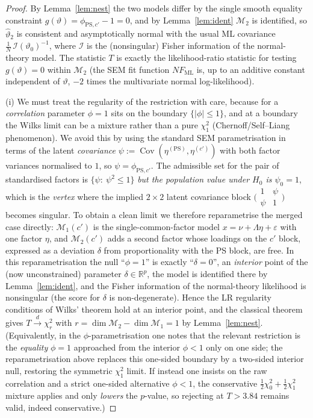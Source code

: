 \documentclass{amsart}
\theoremstyle{remark}
\begin{document}
\begin{proof}
By Lemma~\ref{lem:nest} the two models differ by the single smooth equality
constraint $g(\vartheta)=\phi_{\mathrm{PS},c'}-1=0$, and by Lemma~\ref{lem:ident}
$\mathcal M_2$ is identified, so $\hat\vartheta_2$ is consistent and asymptotically
normal with the usual ML covariance $\frac1N\,\mathcal I(\vartheta_0)^{-1}$, where
$\mathcal I$ is the (nonsingular) Fisher information of the normal-theory model.
The statistic $T$ is exactly the likelihood-ratio statistic for testing
$g(\vartheta)=0$ within $\mathcal M_2$ (the SEM fit function $NF_{\mathrm{ML}}$ is,
up to an additive constant independent of $\vartheta$, $-2$ times the multivariate
normal log-likelihood). 

(i) We must treat the regularity of the restriction with care, because for a
\emph{correlation} parameter $\phi=1$ sits on the boundary $\{|\phi|\le1\}$, and at
a boundary the Wilks limit can be a mixture rather than a pure $\chi^2_1$
(Chernoff/Self--Liang phenomenon). We avoid this by using the standard SEM
parametrisation in terms of the latent \emph{covariance} $\psi:=\operatorname{Cov}(\eta^{(\mathrm{PS})},\eta^{(c')})$
with both factor variances normalised to $1$, so $\psi=\phi_{\mathrm{PS},c'}$.
The admissible set for the pair of standardised factors is
$\{\psi:\ \psi^2\le1\}$ \emph{but the population value under $H_0$ is
$\psi_0=1$}, which is the \emph{vertex} where the implied $2\times2$ latent
covariance block $\bigl(\begin{smallmatrix}1&\psi\\ \psi&1\end{smallmatrix}\bigr)$
becomes singular. To obtain a clean limit we therefore reparametrise the merged
case directly: $\mathcal M_1(c')$ is the single-common-factor model
$x=\nu+\Lambda\eta+\varepsilon$ with one factor $\eta$, and $\mathcal M_2(c')$
adds a second factor whose loadings on the $c'$ block, expressed as a deviation
$\delta$ from proportionality with the PS block, are free. In this
reparametrisation the null ``$\phi=1$'' is exactly ``$\delta=0$'', an
\emph{interior} point of the (now unconstrained) parameter $\delta\in\mathbb R^{p}$,
the model is identified there by Lemma~\ref{lem:ident}, and the Fisher information
of the normal-theory likelihood is nonsingular (the score for $\delta$ is
non-degenerate). Hence the LR regularity conditions of Wilks' theorem hold at an
interior point, and the classical theorem gives $T\xrightarrow{d}\chi^2_r$ with
$r=\dim\mathcal M_2-\dim\mathcal M_1=1$ by Lemma~\ref{lem:nest}. (Equivalently,
in the $\phi$-parametrisation one notes that the relevant restriction is the
\emph{equality} $\phi=1$ approached from the interior $\phi<1$ only on one side;
the reparametrisation above replaces this one-sided boundary by a two-sided
interior null, restoring the symmetric $\chi^2_1$ limit. If instead one insists on
the raw correlation and a strict one-sided alternative $\phi<1$, the conservative
$\tfrac12\chi^2_0+\tfrac12\chi^2_1$ mixture applies and only \emph{lowers} the
$p$-value, so rejecting at $T>3.84$ remains valid, indeed conservative.)


\end{proof}
\end{document}
